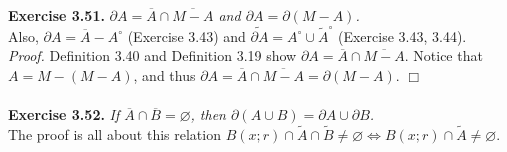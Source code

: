 \documentclass{article}
\begin{document}



\textbf{Exercise 3.51.}
\emph{$\partial A = \overline{A} \cap \overline{M-A}$ and
$\partial A = \partial(M - A)$.} \\

Also, $\partial A = \overline{A} - A^{\circ}$ (Exercise 3.43)
and $\widetilde{\partial A} = A^{\circ} \cup \widetilde{A}^{\circ}$
(Exercise 3.43, 3.44). \\

\emph{Proof.}
Definition 3.40 and Definition 3.19 show $\partial A = \overline{A} \cap \overline{M-A}$.
Notice that $A = M - (M-A)$, and thus
$\partial A = \overline{A} \cap \overline{M-A} = \partial(M - A)$.
$\Box$ \\\\





\textbf{Exercise 3.52.}
\emph{If $\overline{A} \cap \overline{B} = \varnothing$,
then $\partial(A \cup B) = \partial A \cup \partial B$.} \\

The proof is all about this relation
$B(x;r) \cap \widetilde{A} \cap \widetilde{B} \neq \varnothing
\Longleftrightarrow
B(x;r) \cap \widetilde{A} \neq \varnothing.$ \\
\end{document}
